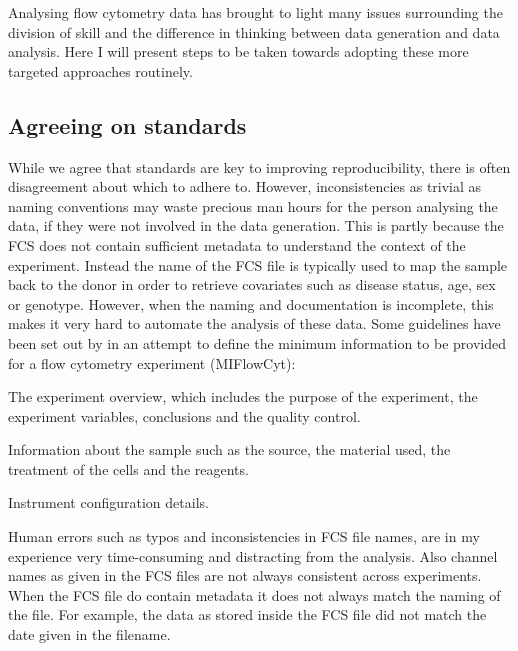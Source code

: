 Analysing flow cytometry data has brought to light many issues surrounding the division of skill and the difference in thinking between data generation and data analysis.
Here I will present steps to be taken towards adopting these more targeted approaches routinely.

\subsection{Agreeing on standards}

While we agree that standards are key to improving reproducibility, there is often disagreement about which to adhere to.
However, inconsistencies as trivial as naming conventions may waste precious man hours for the person analysing the data, if they were not involved in the data generation.
This is partly because the \acrfull{FCS} does not contain sufficient metadata to understand the context of the experiment.
Instead the name of the FCS file is typically used to map the sample back to the donor in order to retrieve covariates such as disease status, age, sex or genotype.
However, when the naming and documentation is incomplete, this makes it very hard to automate the analysis of these data.
Some guidelines have been set out by \citet{Lee:2008ed} in an attempt to define the minimum information to be provided for a flow cytometry experiment (MIFlowCyt):
\begin{itemise}
\item The experiment overview, which includes the purpose of the experiment, the experiment variables, conclusions and the quality control.
\item Information about the sample such as the source, the material used, the treatment of the cells and the reagents.
\item Instrument configuration details.
\end{itemise}
Human errors such as typos and inconsistencies in FCS file names, are in my experience very time-consuming and distracting from the analysis.
Also channel names as given in the FCS files are not always consistent across experiments.
When the FCS file do contain metadata it does not always match the naming of the file.
For example, the data as stored inside the FCS file did not match the date given in the filename.

